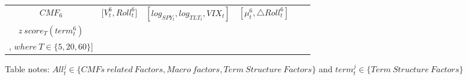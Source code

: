 \documentclass[10pt,letterpaper]{article}
\begin{document}
\begin{table}[!ht]
\begin{adjustwidth}{-2.25in}{0in}
{\begin{tabular}{|c|c|c|c|c|c|}
    \hline
    \(CMF_{6}\) & \({[V_{t}^6},{Roll_{t}^6]}\) & \([log_{SPY_t},log_{TLT_t},VIX_t]\) & \({[\mu_{t}^6, \triangle Roll_{t}^6]}\) & \makecell[c]{\([Std_{T}(All_{t}^{6}), Skew_{T}^{6}(All_{t}^{6}),Kurt_T(All_{t}^{6}),Mean_{T}(All_{t}^{6})\),\\ \(z\ score_{T}(term_{t}^{6})\)\\ , \(where \: T \in \{5,20, 60\}\)]}  \\
    \hline %
\end{tabular}}
\begin{flushleft} Table notes: \( All_{t}^{j} \in \{CMFs\ related \ Factors, Macro \ factors, Term\ Structure\ Factors\}\) and \(term_{t}^{j} \in \{Term\ Structure\ Factors \}\)
\end{flushleft}
\label{table_all}
\end{adjustwidth}
\end{table}
\end{document}
